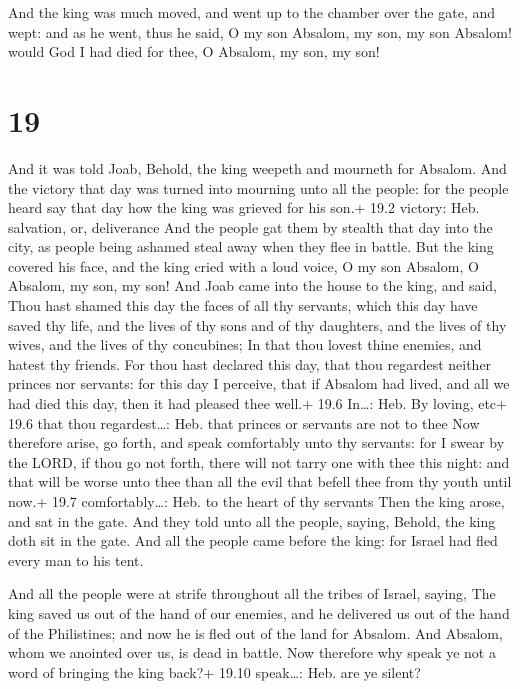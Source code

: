  And the king was much moved, and went up to the chamber
over the gate, and wept: and as he went, thus he said, O my son Absalom,
my son, my son Absalom! would God I had died for thee, O Absalom, my
son, my son!

\hypertarget{section-18}{%
\section{19}\label{section-18}}

 And it was told Joab, Behold, the king weepeth and mourneth
for Absalom.  And the victory that day was turned into
mourning unto all the people: for the people heard say that day how the
king was grieved for his son.+ 19.2 victory: Heb. salvation, or,
deliverance  And the people gat them by stealth that day
into the city, as people being ashamed steal away when they flee in
battle.  But the king covered his face, and the king cried
with a loud voice, O my son Absalom, O Absalom, my son, my son!
 And Joab came into the house to the king, and said, Thou
hast shamed this day the faces of all thy servants, which this day have
saved thy life, and the lives of thy sons and of thy daughters, and the
lives of thy wives, and the lives of thy concubines;  In
that thou lovest thine enemies, and hatest thy friends. For thou hast
declared this day, that thou regardest neither princes nor servants: for
this day I perceive, that if Absalom had lived, and all we had died this
day, then it had pleased thee well.+ 19.6 In\ldots: Heb. By loving, etc+
19.6 that thou regardest\ldots: Heb. that princes or servants are not to
thee  Now therefore arise, go forth, and speak comfortably
unto thy servants: for I swear by the LORD, if thou go not forth, there
will not tarry one with thee this night: and that will be worse unto
thee than all the evil that befell thee from thy youth until now.+ 19.7
comfortably\ldots: Heb. to the heart of thy servants  Then
the king arose, and sat in the gate. And they told unto all the people,
saying, Behold, the king doth sit in the gate. And all the people came
before the king: for Israel had fled every man to his tent.

 And all the people were at strife throughout all the
tribes of Israel, saying, The king saved us out of the hand of our
enemies, and he delivered us out of the hand of the Philistines; and now
he is fled out of the land for Absalom.  And Absalom, whom
we anointed over us, is dead in battle. Now therefore why speak ye not a
word of bringing the king back?+ 19.10 speak\ldots: Heb. are ye silent?

